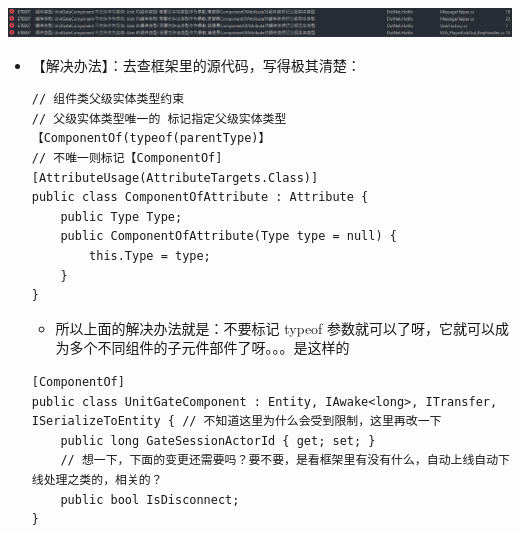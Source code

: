 \documentclass[9pt, b5paper]{article}
\begin{document}
\includegraphics[width=.9\linewidth]{./pic/et4_20230616_165317.png}
\begin{itemize}
\item 【解决办法】：去查框架里的源代码，写得极其清楚：
\begin{verbatim}
// 组件类父级实体类型约束
// 父级实体类型唯一的 标记指定父级实体类型【ComponentOf(typeof(parentType)】
// 不唯一则标记【ComponentOf]
[AttributeUsage(AttributeTargets.Class)]
public class ComponentOfAttribute : Attribute {
    public Type Type;
    public ComponentOfAttribute(Type type = null) {
        this.Type = type;
    }
}
\end{verbatim}
\begin{itemize}
\item 所以上面的解决办法就是：不要标记 typeof 参数就可以了呀，它就可以成为多个不同组件的子元件部件了呀。。。是这样的
\end{itemize}
\begin{verbatim}
[ComponentOf] 
public class UnitGateComponent : Entity, IAwake<long>, ITransfer, ISerializeToEntity { // 不知道这里为什么会受到限制，这里再改一下
    public long GateSessionActorId { get; set; }
    // 想一下，下面的变更还需要吗？要不要，是看框架里有没有什么，自动上线自动下线处理之类的，相关的？
    public bool IsDisconnect;
}
\end{verbatim}
\end{itemize}
\end{document}
